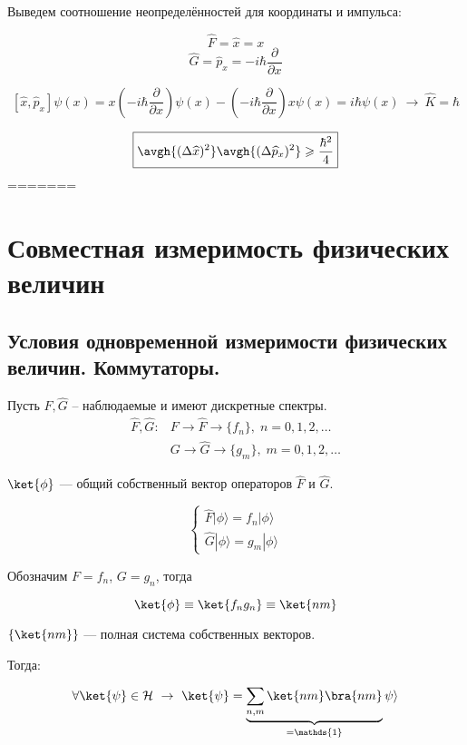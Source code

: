 \begin{exmpl} Выведем соотношение неопределённостей для координаты и импульса:

$$\widehat{F}=\widehat{x}=x$$
$$\widehat{G}=\widehat{p}_x=-i\hbar\frac{\partial}{\partial{x}}$$

$$[\widehat{x},\widehat{p}_x]\psi(x)=x(-i\hbar\frac{\partial}{\partial{x}})\psi(x)-(-i\hbar\frac{\partial}{\partial{x}})x\psi(x)=i\hbar\psi(x)~\to~\widehat{K}=\hbar$$


$$\boxed{\avgh{(\Delta\widehat{x})^2}\avgh{(\Delta\widehat{p}_x)^2} \geqslant \frac{\hbar^2}{4}}$$
=======
\chapter{Совместная измеримость физических величин}

\section{Условия одновременной измеримости физических величин. Коммутаторы.}

Пусть $\widehat{F}, \widehat{G}$ -- наблюдаемые и имеют дискретные спектры.
$$
\begin{array}{lcl}
\widehat{F}, \widehat{G}:  & F \rightarrow \widehat{F} \rightarrow \{f_n\}, \; n=0,1,2,\dots\\
                           & G \rightarrow \widehat{G} \rightarrow \{g_m\}, \; m=0,1,2,\dots
\end{array}
$$

$\ket{\phi}$ --- общий собственный вектор операторов $\widehat{F}$ и $\widehat{G}$.

\begin{equation}
\label{eq:4_1_1}
\begin{cases}
\widehat{F} |\phi \rangle = f_n |\phi \rangle\\
\widehat{G} |\phi \rangle = g_m |\phi \rangle
\end{cases} 
\end{equation}

Обозначим $F = f_n$, $G=g_n$, тогда

$$\ket{\phi} \equiv \ket{f_n g_n} \equiv \ket{nm}$$

$\{\ket{nm}\}$ --- полная система собственных векторов.

Тогда:

\begin{equation}
\label{eq:4_1_2}
\forall \ket{\psi} \in \mathcal{H} ~\rightarrow ~ \ket{\psi} = \underbrace{\sum_{n,m}\ket{nm}\bra{nm}}_{=\mathds{1}} \psi \rangle 
\end{equation}


\end{exmpl}

